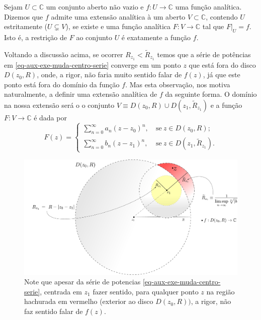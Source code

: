 \begin{definicao}
\label{def-ext-analitica}
Sejam $U\subset\mathbb{C}$ um conjunto aberto não vazio e
$f:U\to\mathbb{C}$ uma função analítica. Dizemos que $f$ admite
uma extensão analítica à um aberto $V\subset \mathbb{C}$,
contendo $U$ estritamente ($U\subsetneq V$), se existe e uma função analítica $F:V\to\mathbb{C}$ 
tal que $F|_{U}= f$. Isto é, a restrição de $F$ ao conjunto $U$ 
é exatamente a função $f$. 
\end{definicao}


Voltando a discussão acima, se ocorrer $R_{z_1} < \widetilde{R}_{z_1}$
temos que a série de potências em \eqref{eq-aux-exe-muda-centro-serie} 
converge em um ponto $z$ que está
fora do disco $D(z_0,R)$, onde, a rigor, não faria muito sentido falar
de $f(z)$, já que este ponto está fora do domínio da função $f$.
Mas esta observação, nos motiva naturalmente, a definir uma extensão 
analítica de $f$ da seguinte forma. O domínio na nossa extensão será o 
o conjunto $V \equiv D(z_0,R)\cup D(z_1,\widetilde{R}_{z_1})$ e a função
$F:V\to\mathbb{C}$ é dada por 
\[
F(z)
=
\begin{cases}
\displaystyle\sum_{n=0}^{\infty}a_n(z-z_0)^n,&\ \text{se}\ z\in D(z_0,R);
\\[0.9cm]
\displaystyle\sum_{n=0}^{\infty}b_n(z-z_1)^n,&\ \text{se}\ z\in D(z_1,\widetilde{R}_{z_1}).  
\end{cases}
\]

\bigskip 

\begin{figure}[h]
\centering
\includegraphics[width=0.95\linewidth]{Figuras/Raio-func-analitica-muda-centro}
\caption{Note que apesar da série de potencias \eqref{eq-aux-exe-muda-centro-serie}, 
centrada em $z_1$ fazer sentido, para qualquer ponto $z$ na região hachurada em vermelho (exterior ao disco $D(z_0,R))$, a rigor, não faz sentido falar de $f(z)$.}
\label{fig:raio-func-analitica-muda-centro}
\end{figure}


